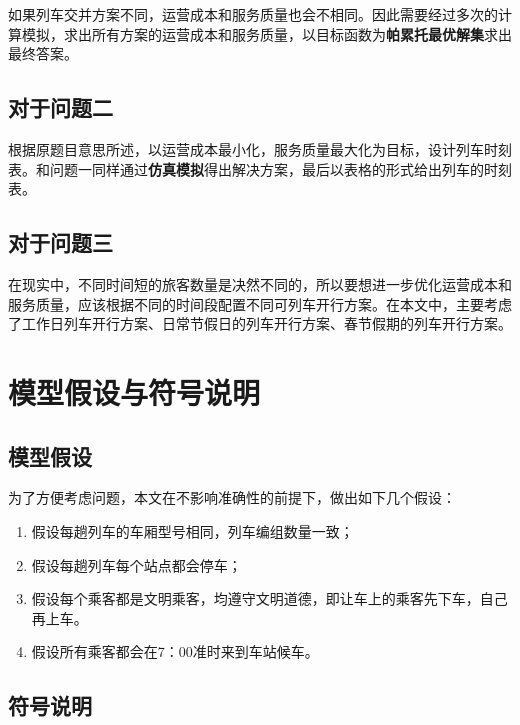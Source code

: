 如果列车交并方案不同，运营成本和服务质量也会不相同。因此需要经过多次的计算模拟，求出所有方案的运营成本和服务质量，以目标函数为\textbf{帕累托最优解集}求出最终答案。

\subsection{对于问题二}

根据原题目意思所述，以运营成本最小化，服务质量最大化为目标，设计列车时刻表。和问题一同样通过\textbf{仿真模拟}得出解决方案，最后以表格的形式给出列车的时刻表。

\subsection{对于问题三}

在现实中，不同时间短的旅客数量是决然不同的，所以要想进一步优化运营成本和服务质量，应该根据不同的时间段配置不同可列车开行方案。在本文中，主要考虑了工作日列车开行方案、日常节假日的列车开行方案、春节假期的列车开行方案。



%
%

\section{模型假设与符号说明}

\subsection{模型假设}

为了方便考虑问题，本文在不影响准确性的前提下，做出如下几个假设：

\begin{enumerate}
    \item 假设每趟列车的车厢型号相同，列车编组数量一致；
    \item 假设每趟列车每个站点都会停车；
    \item 假设每个乘客都是文明乘客，均遵守文明道德，即让车上的乘客先下车，自己再上车。
    \item 假设所有乘客都会在7：00准时来到车站候车。
\end{enumerate}

\subsection{符号说明}

